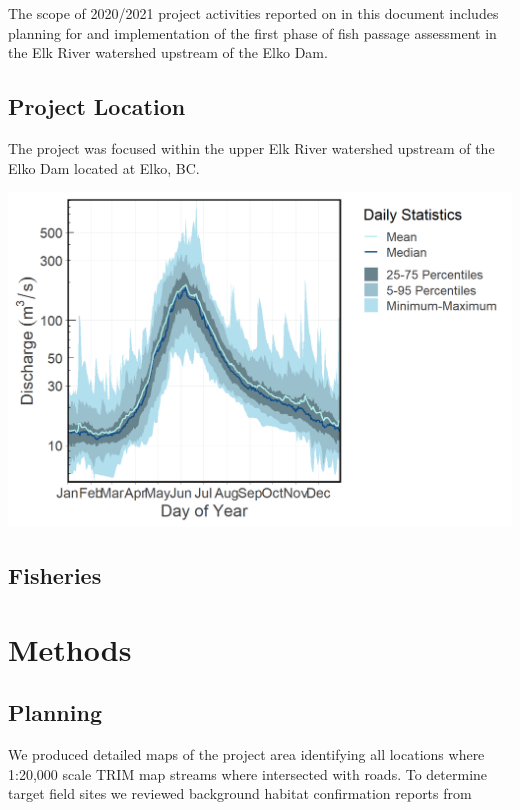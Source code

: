 \documentclass[
]{book}
\begin{document}
The scope of 2020/2021 project activities reported on in this document includes planning for and implementation of the first phase of fish passage assessment in the Elk River watershed upstream of the Elko Dam.

\hypertarget{project-location}{%
\section{Project Location}\label{project-location}}

The project was focused within the upper Elk River watershed upstream of the Elko Dam located at Elko, BC.

\includegraphics{fig/hydrology1.png}

\hypertarget{fisheries}{%
\section{Fisheries}\label{fisheries}}

\hypertarget{methods}{%
\chapter{Methods}\label{methods}}

\hypertarget{planning}{%
\section{Planning}\label{planning}}

We produced detailed maps of the project area identifying all locations where 1:20,000 scale TRIM map streams where intersected with roads. To determine target field sites we reviewed background habitat confirmation reports from \citep{masseEKConfirmation2015}
\end{document}
